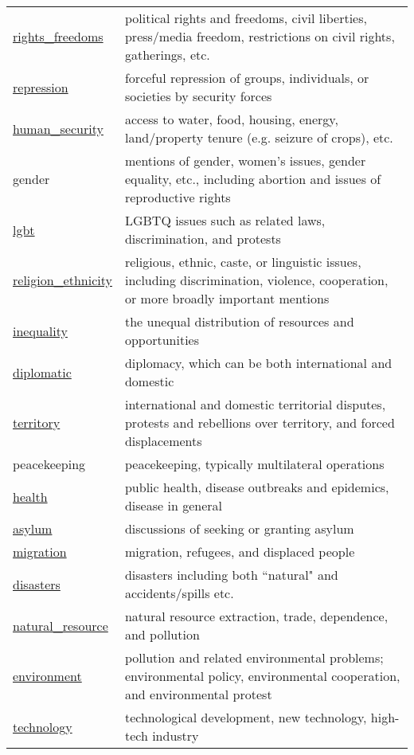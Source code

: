 \documentclass[11pt]{report}
\begin{document}
\begin{longtable}{|p{}|L{.73\textwidth}|}
\hyperref[context:rightsfree]{rights\_freedoms} & political rights and freedoms, civil liberties, press/media freedom, restrictions on civil rights, gatherings, etc.\\
\hyperref[context:repression]{repression} & forceful repression of groups, individuals, or societies by security forces \\
\hyperref[context:human-sec]{human\_security} & access to water, food, housing, energy, land/property tenure (e.g. seizure of crops), etc. \\
gender & mentions of gender, women's issues, gender equality, etc., including abortion and issues of reproductive rights\\
\hyperref[context:lgbt]{lgbt} & LGBTQ issues such as related laws, discrimination, and protests\\
\hyperref[context:religethno]{religion\_ethnicity} & religious, ethnic, caste, or linguistic issues, including discrimination, violence, cooperation, or more broadly important mentions \\
\hyperref[context:inequality]{inequality} & the unequal distribution of resources and opportunities  \\
\hyperref[context:diplomatic]{diplomatic} & diplomacy, which can be both international and domestic \\
\hyperref[context:territory]{territory} & international and domestic territorial disputes, protests and rebellions over territory, and forced displacements\\
peacekeeping & peacekeeping, typically multilateral operations \\
\hyperref[context:health]{health} & public health, disease outbreaks and epidemics, disease in general \\
\hyperref[context:asylum]{asylum} & discussions of seeking or granting asylum \\
\hyperref[context:migration]{migration}  & migration, refugees, and displaced people \\
\hyperref[context:disasters]{disasters} & disasters including both ``natural" and accidents/spills etc. \\
\hyperref[context:natural-resource]{natural\_resource} & natural resource extraction, trade, dependence, and pollution \\
\hyperref[context:environment]{environment} & pollution and related environmental problems; environmental policy, environmental cooperation, and environmental protest \\
\hyperref[context:tech]{technology} & technological development, new technology, high-tech industry\\

\end{longtable}
\end{document}
